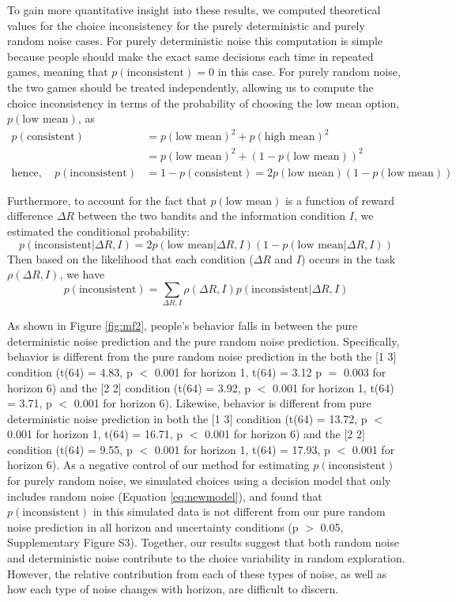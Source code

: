 \documentclass[12pt]{article}
\begin{document}
{To gain more quantitative insight into these results, we computed theoretical values for the choice inconsistency for the purely deterministic and purely random noise cases.  For purely deterministic noise this computation is simple because people should make the exact same decisions each time in repeated games, meaning that $p(\mbox{inconsistent}) = 0$ in this case. For purely random noise, the two games should be treated independently, allowing us to compute the choice inconsistency in terms of the probability of choosing the low mean option, $p(\mbox{low mean})$, as
\begin{equation*}
	\begin{split}
		p(\mbox{consistent}) &= p(\mbox{low mean})^2 + p(\mbox{high mean})^2\\
		&= p(\mbox{low mean})^2 + (1-p(\mbox{low mean}))^2\\ 
		\mbox{hence},\quad p(\mbox{inconsistent}) &=  
		1 - p(\mbox{consistent}) = 
		2 p(\mbox{low mean})(1-p(\mbox{low mean}))
	\end{split}
\end{equation*}

Furthermore, to account for the fact that $p(\mbox{low mean})$ is a function of reward difference $\Delta R$ between the two bandits and the information condition $I$, we estimated the conditional probability:
	$$p(\mbox{inconsistent}|\Delta R, I) = 2 p(\mbox{low mean}|\Delta R, I)(1-p(\mbox{low mean}|\Delta R, I))$$
	Then based on the likelihood that each condition ($\Delta R$ and $I$) occurs in the task $\rho(\Delta R, I)$, we have
	$$p(\mbox{inconsistent}) = \sum_{\Delta R, I}\rho(\Delta R, I)p(\mbox{inconsistent}|\Delta R, I)$$

As shown in Figure \ref{fig:mf2}, people's behavior falls in between the pure deterministic noise prediction and the pure random noise prediction. Specifically, behavior is different from the pure random noise prediction in the both the [1 3] condition (t(64) = 4.83, p $<$ 0.001 for horizon 1, t(64) = 3.12 p $=$ 0.003 for horizon 6) and the [2 2] condition (t(64) = 3.92, p $<$ 0.001 for horizon 1, t(64) = 3.71, p $<$ 0.001 for horizon 6). Likewise, behavior is different from pure deterministic noise prediction in both the [1 3] condition (t(64) = 13.72, p $<$ 0.001 for horizon 1, t(64) = 16.71, p $<$ 0.001 for horizon 6) and the [2 2] condition (t(64) = 9.55, p $<$ 0.001 for horizon 1, t(64) = 17.93, p $<$ 0.001 for horizon 6). As a negative control of our method for estimating $p(\mbox{inconsistent})$ for purely random noise, we simulated choices using a decision model that only includes random noise (Equation \ref{eq:newmodel}), and found that $p(\mbox{inconsistent})$ in this simulated data is not different from our pure random noise prediction in all horizon and uncertainty conditions (p $>$ 0.05, Supplementary Figure S3). Together, our results suggest that both random noise and deterministic noise contribute to the choice variability in random exploration. However, the relative contribution from each of these types of noise, as well as how each type of noise changes with horizon, are difficult to discern.

}
\end{document}
